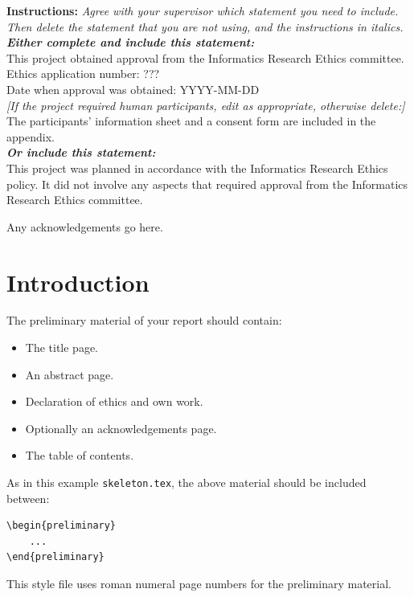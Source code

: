 \documentclass[logo,bsc,singlespacing,parskip]{infthesis}
\begin{document}
\begin{preliminary}
\begin{ethics}
\textbf{Instructions:} \emph{Agree with your supervisor which
statement you need to include. Then delete the statement that you are not using,
and the instructions in italics.\\
\textbf{Either complete and include this statement:}}\\ %
%
This project obtained approval from the Informatics Research Ethics committee.\\
Ethics application number: ???\\
Date when approval was obtained: YYYY-MM-DD\\
%
\emph{[If the project required human participants, edit as appropriate, otherwise delete:]}\\ %
The participants' information sheet and a consent form are included in the appendix.\\
%
\textbf{\emph{Or include this statement:}}\\ %
This project was planned in accordance with the Informatics Research
Ethics policy. It did not involve any aspects that required approval
from the Informatics Research Ethics committee.

\standarddeclaration
\end{ethics}


\begin{acknowledgements}
Any acknowledgements go here.
\end{acknowledgements}


\tableofcontents
\end{preliminary}


\chapter{Introduction}

The preliminary material of your report should contain:
\begin{itemize}
\item
The title page.
\item
An abstract page.
\item
Declaration of ethics and own work.
\item
Optionally an acknowledgements page.
\item
The table of contents.
\end{itemize}

As in this example \texttt{skeleton.tex}, the above material should be
included between:
\begin{verbatim}
\begin{preliminary}
    ...
\end{preliminary}
\end{verbatim}
This style file uses roman numeral page numbers for the preliminary material.
\end{document}

